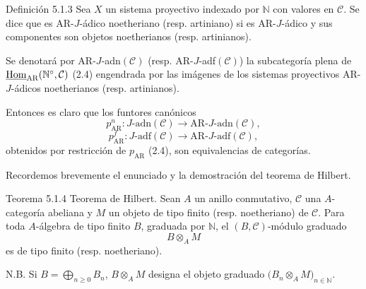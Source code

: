 \begin{statement}{Definición 5.1.3}
Sea \(X\) un sistema proyectivo indexado por \(\mathbb N\) con valores en \(\mathcal C\). Se dice que es AR-\(J\)-ádico noetheriano (resp. artiniano) si es AR-\(J\)-ádico y sus componentes son objetos noetherianos (resp. artinianos).
\end{statement}

Se denotará por AR-\(J\)-adn\((\mathcal C)\) (resp. AR-\(J\)-adf\((\mathcal C)\)) la subcategoría plena de \(\underline{\operatorname{Hom}}_{\mathrm{AR}}(\mathbb N^\circ,\mathcal C)\) (2.4) engendrada por las imágenes de los sistemas proyectivos AR-\(J\)-ádicos noetherianos (resp. artinianos).

Entonces es claro que los funtores canónicos
\[
p^n_{\mathrm{AR}}:J\text{-adn}(\mathcal C)\longrightarrow \mathrm{AR}\text{-}J\text{-adn}(\mathcal C),
\]
\[
p^f_{\mathrm{AR}}:J\text{-adf}(\mathcal C)\longrightarrow \mathrm{AR}\text{-}J\text{-adf}(\mathcal C),
\]
obtenidos por restricción de \(p_{\mathrm{AR}}\) (2.4), son equivalencias de categorías.

Recordemos brevemente el enunciado y la demostración del teorema de Hilbert.

\begin{statement}{Teorema 5.1.4}
Teorema de Hilbert. Sean \(A\) un anillo conmutativo, \(\mathcal C\) una \(A\)-categoría abeliana y \(M\) un objeto de tipo finito (resp. noetheriano) de \(\mathcal C\). Para toda \(A\)-álgebra de tipo finito \(B\), graduada por \(\mathbb N\), el \((B,\mathcal C)\)-módulo graduado
\[
B\otimes_A M
\]
es de tipo finito (resp. noetheriano).

N.B. Si \(B=\bigoplus_{n\ge0}B_n\), \(B\otimes_A M\) designa el objeto graduado \(\bigl(B_n\otimes_A M\bigr)_{n\in\mathbb N}\).
\end{statement}
